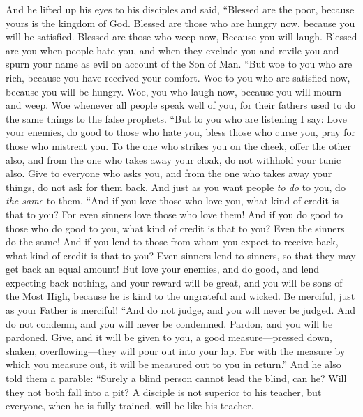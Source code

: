 \begin{biblechapter}
\verse And he lifted up his eyes to his disciples and said,
\verse “Blessed are the poor, 
because yours is the kingdom of God.
\verse Blessed are those who are hungry now, 
because you will be satisfied. 
Blessed are those who weep now, 
Because you will laugh.
\verse Blessed are you when people hate you, and when they exclude you and revile you and spurn your name as evil on account of the Son of Man.
 “But woe to you who are rich, 
because you have received your comfort.
\verse Woe to you who are satisfied now, 
because you will be hungry. 
Woe, you who laugh now, 
because you will mourn and weep.
\verse Woe whenever all people speak well of you, 
for their fathers used to do the same things to the false prophets.
 “But to you who are listening I say: Love your enemies, do good to those who hate you,
\verse bless those who curse you, pray for those who mistreat you.
\verse To the one who strikes you on the cheek, offer the other also, and from the one who takes away your cloak, do not withhold your tunic also.
\verse Give to everyone who asks you, and from the one who takes away your things, do not ask for them back.
\verse And just as you want people \textit{to do} to you, do \textit{the same} to them.
\verse “And if you love those who love you, what kind of credit is that to you? For even sinners love those who love them!
\verse And if you do good to those who do good to you, what kind of credit is that to you? Even the sinners do the same!
\verse And if you lend to those from whom you expect to receive back, what kind of credit is that to you? Even sinners lend to sinners, so that they may get back an equal amount!
\verse But love your enemies, and do good, and lend expecting back nothing, and your reward will be great, and you will be sons of the Most High, because he is kind to the ungrateful and wicked.
\verse Be merciful, just as your Father is merciful!
 “And do not judge, and you will never be judged. And do not condemn, and you will never be condemned. Pardon, and you will be pardoned.
\verse Give, and it will be given to you, a good measure—pressed down, shaken, overflowing—they will pour out into your lap. For with the measure by which you measure out, it will be measured out to you in return.”
\verse And he also told them a parable: “Surely a blind person cannot lead the blind, can he? Will they not both fall into a pit?
\verse A disciple is not superior to his teacher, but everyone, when he is fully trained, will be like his teacher.

\end{biblechapter}
